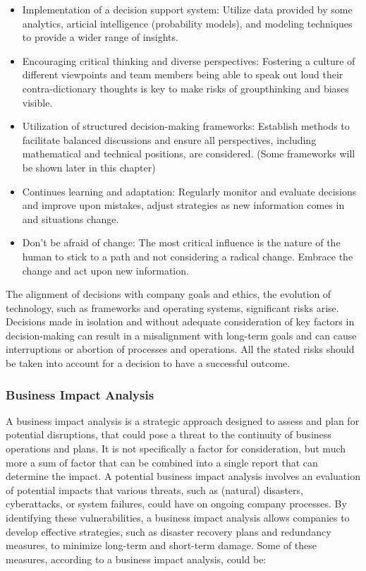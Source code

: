 \begin{itemize}
    \item Implementation of a decision support system: Utilize data provided by some analytics, articial intelligence (probability models), and modeling techniques to provide a wider range of insights.
    \item Encouraging critical thinking and diverse perspectives: Fostering a culture of different viewpoints and team members being able to speak out loud their contra-dictionary thoughts is key to make risks of groupthinking and biases visible.
    \item Utilization of structured decision-making frameworks: Establish methods to facilitate balanced discussions and ensure all perspectives, including mathematical and technical positions, are considered. (Some frameworks will be shown later in this chapter)
    \item Continues learning and adaptation: Regularly monitor and evaluate decisions and improve upon mistakes, adjust strategies as new information comes in and situations change. 
    \item Don't be afraid of change: The most critical influence is the nature of the human to stick to a path and not considering a radical change. Embrace the change and act upon new information.
\end{itemize}

The alignment of decisions with company goals and ethics, the evolution of technology, such as frameworks and operating systems, significant risks arise. Decisions made in isolation and without adequate consideration of key factors in decision-making can result in a misalignment with long-term goals and can cause interruptions or abortion of processes and operations. All the stated risks should be taken into account for a decision to have a successful outcome. \cite{lech_causes_2016}

\subsubsection{Business Impact Analysis}
A business impact analysis is a strategic approach designed to assess and plan for potential disruptions, that could pose a threat to the continuity of business operations and plans. It is not specifically a factor for consideration, but much more a sum of factor that can be combined into a single report that can determine the impact. A potential business impact analysis involves an evaluation of potential impacts that various threats, such as (natural) disasters, cyberattacks, or system failures, could have on ongoing company processes. By identifying these vulnerabilities, a business impact analysis allows companies to develop effective strategies, such as disaster recovery plans and redundancy measures, to minimize long-term and short-term damage.
\newline \noindent Some of these measures, according to a business impact analysis, could be: 

